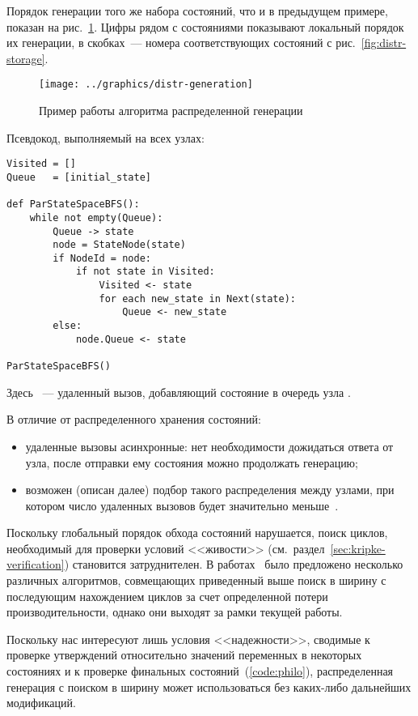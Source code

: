 Порядок генерации того же набора состояний, что и в предыдущем примере, показан на
рис.~\ref{fig:distr-generation}. Цифры рядом с состояниями показывают локальный порядок их
генерации, в скобках~--- номера соответствующих состояний с рис.~\ref{fig:distr-storage}.

\begin{figure}[!htb]
  \centering
  \texttt{[image: ../graphics/distr-generation]}
  \caption{Пример работы алгоритма распределенной генерации}
  \label{fig:distr-generation}
\end{figure}

Псевдокод, выполняемый на всех узлах:

\begin{lstlisting}[style=pseudocode]
Visited = []
Queue   = [initial_state]

def ParStateSpaceBFS():
    while not empty(Queue):
        Queue -> state
        node = StateNode(state)
        if NodeId = node:
            if not state in Visited:
                Visited <- state
                for each new_state in Next(state):
                    Queue <- new_state
        else:
            node.Queue <- state

ParStateSpaceBFS()
\end{lstlisting}

Здесь ~--- удаленный вызов, добавляющий состояние в очередь узла
.

В отличие от распределенного хранения состояний:
\begin{itemize}
\item удаленные вызовы асинхронные: нет необходимости дожидаться ответа от узла, после
  отправки ему состояния можно продолжать генерацию;
\item возможен (описан далее) подбор такого распределения  между узлами,
  при котором число удаленных вызовов будет значительно меньше~\cite{LS99}.
\end{itemize}

Поскольку глобальный порядок обхода состояний нарушается, поиск циклов, необходимый для
проверки условий <<живости>> (см.~раздел~\ref{sec:kripke-verification}) становится
затруднителен. В работах~\cite{DLTL1,DLTL2} было предложено несколько различных
алгоритмов, совмещающих приведенный выше поиск в ширину с последующим нахождением циклов
за счет определенной потери производительности, однако они выходят за рамки текущей
работы.

Поскольку нас интересуют лишь условия <<надежности>>, сводимые к проверке утверждений
относительно значений переменных в некоторых состояниях и к проверке финальных
состояний~(\ref{code:philo}), распределенная генерация с поиском в ширину может
использоваться без каких-либо дальнейших модификаций.


